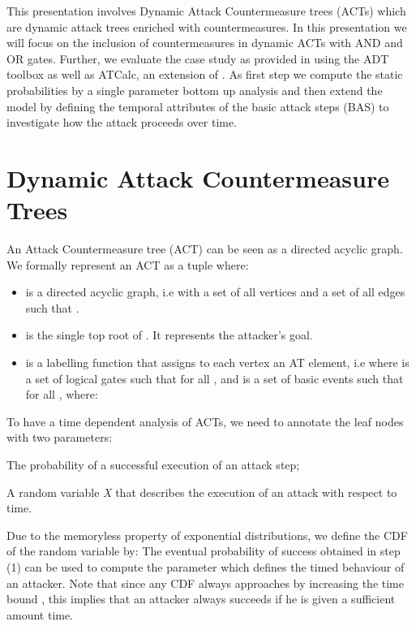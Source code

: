 \documentclass[submission,copyright,creativecommons]{eptcs}
\begin{document}
This presentation involves Dynamic Attack Countermeasure trees (ACTs) which are dynamic attack trees enriched with countermeasures. In this presentation we will focus on the inclusion of countermeasures in dynamic ACTs with AND and OR gates. Further, we evaluate the case study as provided in \cite{ACT} using the ADT toolbox\cite{ADT} as well as ATCalc, an extension of \cite{ATCalc}. As first step we compute the static probabilities by a single parameter bottom up analysis and then extend the model by defining the temporal attributes of the basic attack steps (BAS) to investigate how the attack proceeds over time.

\section{Dynamic Attack Countermeasure Trees}

An Attack Countermeasure tree (ACT) can be seen as a directed acyclic graph. We formally represent an ACT as a tuple  where:
\begin{itemize}
\item  is a directed acyclic graph, i.e  with  a set of all vertices and  a set of all edges such that . 
\item  is the single top root of . It represents the attacker's goal.
\item  is a labelling function that assigns to each vertex an AT element, i.e  where  is a set of logical gates such that for all ,  and   is a set of basic events such that for all ,  where:
\end{itemize}
To have a time dependent analysis of ACTs, we need to annotate the leaf nodes with two parameters:
\begin{inparaenum}
\item The probability of a successful execution of an attack step;
\item A random variable \textit{X} that describes the execution of an attack with respect to time.
\end{inparaenum}
Due to the memoryless property of exponential distributions, we define the CDF of the random variable  by:
The eventual probability of success obtained in step (1) can be used to compute the parameter  which defines the timed behaviour of an attacker. Note that since any CDF always approaches  by increasing the time bound , this implies that an attacker always succeeds if he is given a sufficient amount time.
\end{document}
